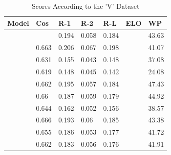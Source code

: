 \documentclass[conference]{IEEEtran}
\begin{document}
\begin{table}[htbp]
\caption{Scores According to the 'V' Dataset}
\begin{center}
\begin{tabular}{|S|a|a|a|a|a|a|}
\hline
\textbf{Model} & \textbf{Cos} & \textbf{R-1} & \textbf{R-2} & \textbf{R-L} & \textbf{ELO} & \textbf{WP} \\
\hline
{} &  & 0.194 & 0.058 & 0.184 &  & 43.63 \\
\hline
{} & 0.663 & 0.206 & 0.067 & 0.198 &  & 41.07 \\
\hline
{} & 0.631 & 0.155 & 0.043 & 0.148 &  & 37.08 \\
\hline
{} & 0.619 & 0.148 & 0.045 & 0.142 &  & 24.08 \\
\hline
{} & 0.662 & 0.195 & 0.057 & 0.184 &  & 47.43 \\
\hline
{} & 0.66 & 0.187 & 0.059 & 0.179 &  & 44.92 \\
\hline
{} & 0.644 & 0.162 & 0.052 & 0.156 &  & 38.57 \\
\hline
{} & 0.666 & 0.193 & 0.06 & 0.185 &  & 43.38 \\
\hline
{} & 0.655 & 0.186 & 0.053 & 0.177 &  & 41.72 \\
\hline
{} & 0.662 & 0.183 & 0.056 & 0.176 &  & 41.91 \\
\hline
\end{tabular}
\label{Vskorlar}
\end{center}
\end{table}
\end{document}
